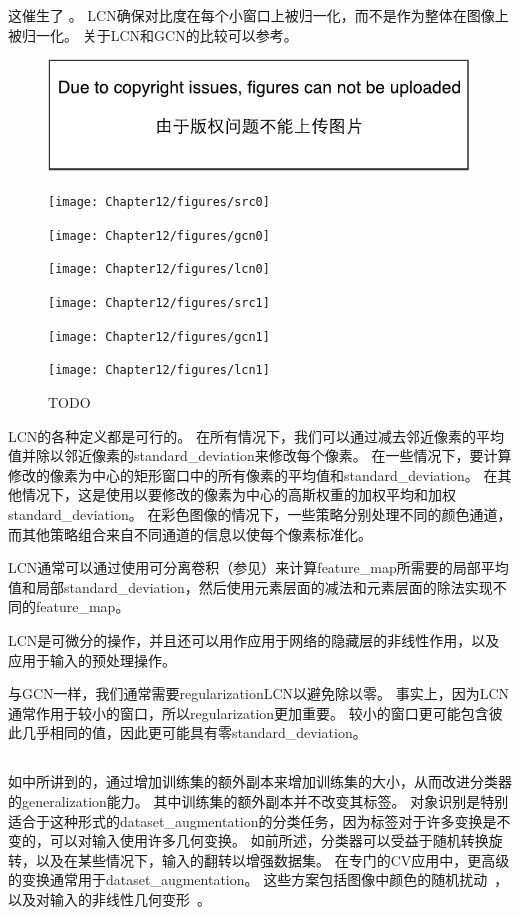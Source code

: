 这催生了 。
\gls{LCN}确保对比度在每个小窗口上被归一化，而不是作为整体在图像上被归一化。
关于\gls{LCN}和\gls{GCN}的比较可以参考。
\begin{figure}[!htb]
\ifOpenSource
\centerline{\includegraphics{figure.pdf}}
\else
	\centerline{\texttt{[image: Chapter12/figures/src0]}}
	\centerline{\texttt{[image: Chapter12/figures/gcn0]}}
	\centerline{\texttt{[image: Chapter12/figures/lcn0]}}	
	\centerline{\texttt{[image: Chapter12/figures/src1]}}
	\centerline{\texttt{[image: Chapter12/figures/gcn1]}}
	\centerline{\texttt{[image: Chapter12/figures/lcn1]}}				
\fi
	\caption{TODO}
	\label{fig:122}
\end{figure}

\gls{LCN}的各种定义都是可行的。
 在所有情况下，我们可以通过减去邻近像素的平均值并除以邻近像素的\gls{standard_deviation}来修改每个像素。
在一些情况下，要计算修改的像素为中心的矩形窗口中的所有像素的平均值和\gls{standard_deviation}\citep{Pinto08}。
在其他情况下，这是使用以要修改的像素为中心的高斯权重的加权平均和加权\gls{standard_deviation}。
在彩色图像的情况下，一些策略分别处理不同的颜色通道，而其他策略组合来自不同通道的信息以使每个像素标准化\citep{sermanet-icpr-12}。

\gls{LCN}通常可以通过使用可分离卷积（参见）来计算\gls{feature_map}所需要的局部平均值和局部\gls{standard_deviation}，然后使用元素层面的减法和元素层面的除法实现不同的\gls{feature_map}。

\gls{LCN}是可微分的操作，并且还可以用作应用于网络的隐藏层的非线性作用，以及应用于输入的预处理操作。

与\gls{GCN}一样，我们通常需要\gls{regularization}\gls{LCN}以避免除以零。
事实上，因为\gls{LCN}通常作用于较小的窗口，所以\gls{regularization}更加重要。
较小的窗口更可能包含彼此几乎相同的值，因此更可能具有零\gls{standard_deviation}。


\subsection{}
\label{sec:dataset_augmentation_chap12}
如中所讲到的，通过增加训练集的额外副本来增加训练集的大小，从而改进分类器的\gls{generalization}能力。
其中训练集的额外副本并不改变其标签。
对象识别是特别适合于这种形式的\gls{dataset_augmentation}的分类任务，因为标签对于许多变换是不变的，可以对输入使用许多几何变换。
如前所述，分类器可以受益于随机转换旋转，以及在某些情况下，输入的翻转以增强数据集。
 在专门的\gls{CV}应用中，更高级的变换通常用于\gls{dataset_augmentation}。
这些方案包括图像中颜色的随机扰动~\citep{Krizhevsky-2012}，以及对输入的非线性几何变形~\citep{chapter-gradient-document-2001}。





